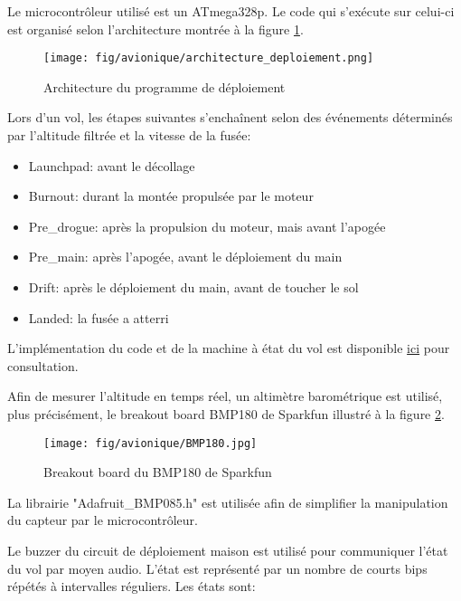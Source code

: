 
Le microcontrôleur utilisé est un ATmega328p. Le code qui s'exécute sur celui-ci
est organisé selon l'architecture montrée à la figure \ref{f:arch_deploiement}.

\begin{figure}[H]
	\center
	\texttt{[image: fig/avionique/architecture\_deploiement.png]}
	\caption{Architecture du programme de déploiement}
	\label{f:arch_deploiement}
\end{figure}

Lors d'un vol, les étapes suivantes s'enchaînent selon des événements déterminés
par l'altitude filtrée et la vitesse de la fusée:

\begin{itemize}
	\item Launchpad: avant le décollage
	\item Burnout: durant la montée propulsée par le moteur
	\item Pre\_drogue: après la propulsion du moteur, mais avant l'apogée
	\item Pre\_main: après l'apogée, avant le déploiement du main
	\item Drift: après le déploiement du main, avant de toucher le sol
	\item Landed: la fusée a atterri
\end{itemize}


L'implémentation du code et de la machine à état du vol est disponible
\href{https://github.com/ul-gaul/deploiement}{ici} pour consultation.


Afin de mesurer l'altitude en temps réel, un altimètre barométrique est
utilisé, plus précisément, le breakout board BMP180 de Sparkfun illustré à la
figure \ref{f:BMP180}.

\begin{figure}[H]
	\center
	\texttt{[image: fig/avionique/BMP180.jpg]}
	\caption{Breakout board du BMP180 de Sparkfun}
	\label{f:BMP180}
\end{figure}

La librairie "Adafruit\_BMP085.h" est utilisée afin de simplifier la
manipulation du capteur par le microcontrôleur.


Le buzzer du circuit de déploiement maison est utilisé pour communiquer l'état
du vol par moyen audio. L'état est représenté par un nombre de courts bips
répétés à intervalles réguliers. Les états sont:

